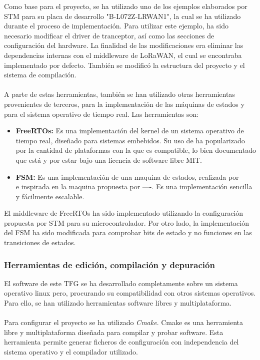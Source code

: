 			Como base para el proyecto, se ha utilizado uno de los ejemplos elaborados por STM para su placa de desarrollo "B-L072Z-LRWAN1", la cual se ha utilizado durante el proceso de implementación. Para utilizar este ejemplo, ha sido necesario modificar el driver de tranceptor, así como las secciones de configuración del hardware. La finalidad de las modificaciones era eliminar las dependencias internas con el middleware de LoRaWAN, el cual se encontraba implementado por defecto. También se modificó la estructura del proyecto y el sistema de compilación.
			\paragraph{}
			
			A parte de estas herramientas, también se han utilizado otras herramientas provenientes de terceros, para la implementación de las máquinas de estados y para el sistema operativo de tiempo real. Las herramientas son:
			
			\begin{itemize}
				\item \textbf{FreeRTOs: } Es una implementación del kernel de un sistema operativo de tiempo real, diseñado para sistemas embebidos. Su uso de ha popularizado por la cantidad de plataformas con la que es compatible, lo bien documentado que está y por estar bajo una licencia de software libre MIT. 
				\item \textbf{FSM: } Es una implementación de una maquina de estados, realizada por ----- e inspirada en la maquina propuesta por ----. Es una implementación sencilla y fácilmente escalable.
			\end{itemize}

				
				El middleware de FreeRTOs ha sido implementado utilizando la configuración propuesta por STM para su microcontrolador. Por otro lado, la implementación del FSM ha sido modificada para comprobar bits de estado y no funciones en las transiciones de estados.
			
		\subsubsection{Herramientas de edición, compilación y depuración}
		
		El software de este TFG se ha desarrollado completamente sobre un sistema operativo linux pero, procurando su compatibilidad con otros sistemas operativos. Para ello, se han utilizado herramientas software libres y multiplataforma.
	\paragraph{}
	Para configurar el proyecto se ha utilizado \textit{Cmake}. Cmake es una herramienta libre y multiplataforma diseñada para compilar y probar software. Esta herramienta permite generar ficheros de configuración con independencia del sistema operativo y el compilador utilizado. 
